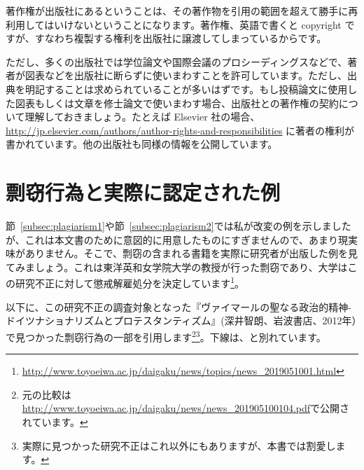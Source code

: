 著作権が出版社にあるということは、その著作物を引用の範囲を超えて勝手に再利用してはいけないということになります。著作権、英語で書くと copyright ですが、すなわち複製する権利を出版社に譲渡してしまっているからです。

ただし、多くの出版社では学位論文や国際会議のプロシーディングスなどで、著者が図表などを出版社に断らずに使いまわすことを許可しています。ただし、出典を明記することは求められていることが多いはずです。もし投稿論文に使用した図表もしくは文章を修士論文で使いまわす場合、出版社との著作権の契約について理解しておきましょう。たとえば Elsevier 社の場合、\url{http://jp.elsevier.com/authors/author-rights-and-responsibilities} に著者の権利が書かれています。他の出版社も同様の情報を公開しています。

\section{剽窃行為と実際に認定された例}

節~\ref{subsec:plagiarism1}や節~\ref{subsec:plagiarism2}では私が改変の例を示しましたが、これは本文書のために意図的に用意したものにすぎませんので、あまり現実味がありません。そこで、剽窃の含まれる書籍を実際に研究者が出版した例を見てみましょう。これは東洋英和女学院大学の教授が行った剽窃であり、大学はこの研究不正に対して懲戒解雇処分を決定しています\footnote{\url{http://www.toyoeiwa.ac.jp/daigaku/news/topics/news_2019051001.html}}。

以下に、この研究不正の調査対象となった『ヴァイマールの聖なる政治的精神-ドイツナショナリズムとプロテスタンティズム』(深井智朗、岩波書店、2012年）で見つかった剽窃行為の一部を引用します\footnote{元の比較は\url{http://www.toyoeiwa.ac.jp/daigaku/news/news_201905100104.pdf}で公開されています。}\footnote{実際に見つかった研究不正はこれ以外にもありますが、本書では割愛します。}。下線は、と別れています。

